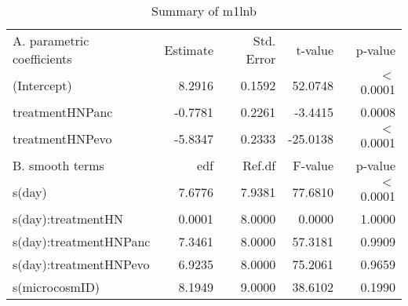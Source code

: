 \begin{table}[ht]
\centering
\begin{tabular}{lrrrr}
   \hline
A. parametric coefficients & Estimate & Std. Error & t-value & p-value \\ 
  (Intercept) & 8.2916 & 0.1592 & 52.0748 & $<$ 0.0001 \\ 
  treatmentHNPanc & -0.7781 & 0.2261 & -3.4415 & 0.0008 \\ 
  treatmentHNPevo & -5.8347 & 0.2333 & -25.0138 & $<$ 0.0001 \\ 
   \hline
B. smooth terms & edf & Ref.df & F-value & p-value \\ 
  s(day) & 7.6776 & 7.9381 & 77.6810 & $<$ 0.0001 \\ 
  s(day):treatmentHN & 0.0001 & 8.0000 & 0.0000 & 1.0000 \\ 
  s(day):treatmentHNPanc & 7.3461 & 8.0000 & 57.3181 & 0.9909 \\ 
  s(day):treatmentHNPevo & 6.9235 & 8.0000 & 75.2061 & 0.9659 \\ 
  s(microcosmID) & 8.1949 & 9.0000 & 38.6102 & 0.1990 \\ 
   \hline
\end{tabular}
\caption{Summary of m1lnb} 
\label{tab.gam}
\end{table}


